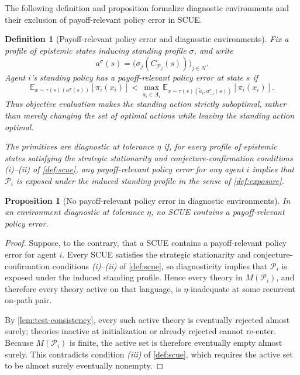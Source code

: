 \documentclass[11pt]{article}
\newtheorem{definition}[assumption]{Definition}
\newtheorem{proposition}[assumption]{Proposition}
\theoremstyle{definition}
\begin{document}
The following definition and proposition formalize diagnostic environments and their exclusion of payoff-relevant policy error in SCUE.

\begin{definition}[Payoff-relevant policy error and diagnostic environments]
\label{def:diagnostic}
Fix a profile of epistemic states inducing standing profile \(\sigma\), and write
\[
a^{\sigma}(s)
=
\bigl(
\sigma_j(C_{\mathcal P_j}(s))
\bigr)_{j\in N}.
\]
Agent \(i\)'s standing policy has a \emph{payoff-relevant policy error} at state \(s\) if
\[
\mathbb E_{x\sim\tau(s)(a^{\sigma}(s))}
\!\left[\pi_i(x_i)\right]
<
\max_{\widetilde a_i\in A_i}
\mathbb E_{x\sim
\tau(s)(\widetilde a_i,a_{-i}^{\sigma}(s))}
\!\left[\pi_i(x_i)\right].
\]
Thus objective evaluation makes the standing action strictly suboptimal, rather than merely changing the set of optimal actions while leaving the standing action optimal.

The primitives are \emph{diagnostic at tolerance \(\eta\)} if, for every profile of epistemic states satisfying the strategic stationarity and conjecture-confirmation conditions \emph{(i)}--\emph{(ii)} of \cref{def:scue}, any payoff-relevant policy error for any agent \(i\) implies that \(\mathcal P_i\) is exposed under the induced standing profile in the sense of \cref{def:exposure}.
\end{definition}

\begin{proposition}[No payoff-relevant policy error in diagnostic environments]
\label{prop:diagnostic}
In an environment diagnostic at tolerance \(\eta\), no SCUE contains a payoff-relevant policy error.
\end{proposition}

\begin{proof}
Suppose, to the contrary, that a SCUE contains a payoff-relevant policy error for agent \(i\).
Every SCUE satisfies the strategic stationarity and conjecture-confirmation conditions \emph{(i)}--\emph{(ii)} of \cref{def:scue}, so diagnosticity implies that \(\mathcal P_i\) is exposed under the induced standing profile.
Hence every theory in \(M(\mathcal P_i)\), and therefore every theory active on that language, is \(\eta\)-inadequate at some recurrent on-path pair.

By \cref{lem:test-consistency}, every such active theory is eventually rejected almost surely; theories inactive at initialization or already rejected cannot re-enter.
Because \(M(\mathcal P_i)\) is finite, the active set is therefore eventually empty almost surely.
This contradicts condition \emph{(iii)} of \cref{def:scue}, which requires the active set to be almost surely eventually nonempty.
\end{proof}
\end{document}
